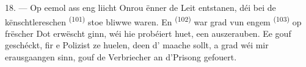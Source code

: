 18. --- Op eemol ass eng liicht Onrou ënner de Leit entstanen, déi bei de
kënschtlereschen  \textsuperscript{(101)} stoe bliwwe waren. En
 \textsuperscript{(102)} war grad vun engem 
\textsuperscript{(103)} op frëscher Dot erwëscht ginn, wéi hie probéiert huet, een
auszerauben. Ee gouf geschéckt, fir e Polizist ze huelen, deen d'
maache sollt, a grad wéi mir erausgaangen sinn, gouf de Verbriecher an d'Prisong
gefouert.

\VUsaut{6.0mm}
\VUfilet{22mm}
